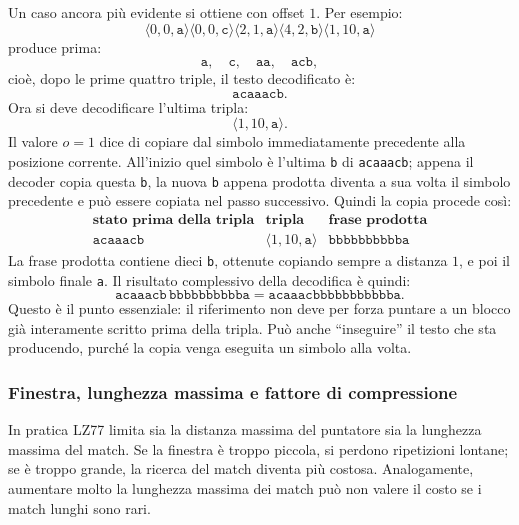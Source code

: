 \documentclass{article}
\theoremstyle{definition}
\numberwithin{equation}{section}
\begin{document}
Un caso ancora più evidente si ottiene con offset $1$. Per esempio:
\[
    \langle 0,0,\texttt{a}\rangle
    \langle 0,0,\texttt{c}\rangle
    \langle 2,1,\texttt{a}\rangle
    \langle 4,2,\texttt{b}\rangle
    \langle 1,10,\texttt{a}\rangle
\]
produce prima:
\[
    \texttt{a},\quad \texttt{c},\quad \texttt{aa},\quad \texttt{acb},
\]
cioè, dopo le prime quattro triple, il testo decodificato è:
\[
    \texttt{acaaacb}.
\]
Ora si deve decodificare l'ultima tripla:
\[
    \langle 1,10,\texttt{a}\rangle.
\]
Il valore $o=1$ dice di copiare dal simbolo immediatamente precedente alla
posizione corrente. All'inizio quel simbolo è l'ultima \texttt{b} di
\texttt{acaaacb}; appena il decoder copia questa \texttt{b}, la nuova
\texttt{b} appena prodotta diventa a sua volta il simbolo precedente e può
essere copiata nel passo successivo. Quindi la copia procede così:
\[
    \begin{array}{c|c|c}
        \textbf{stato prima della tripla} & \textbf{tripla}                & \textbf{frase prodotta} \\ \hline
        \texttt{acaaacb}                  & \langle 1,10,\texttt{a}\rangle & \texttt{bbbbbbbbbba}
    \end{array}
\]
La frase prodotta contiene dieci \texttt{b}, ottenute copiando sempre a
distanza $1$, e poi il simbolo finale \texttt{a}. Il risultato complessivo
della decodifica è quindi:
\[
    \texttt{acaaacb}\,\texttt{bbbbbbbbbba}
    =
    \texttt{acaaacbbbbbbbbbbba}.
\]
Questo è il punto essenziale: il riferimento non deve per forza puntare a
un blocco già interamente scritto prima della tripla. Può anche
``inseguire'' il testo che sta producendo, purché la copia venga eseguita
un simbolo alla volta.

\subsubsection{Finestra, lunghezza massima e fattore di compressione}
In pratica LZ77 limita sia la distanza massima del puntatore sia la lunghezza massima del match. Se la finestra è troppo piccola, si perdono ripetizioni lontane; se è troppo grande, la ricerca del match diventa più costosa. Analogamente, aumentare molto la lunghezza massima dei match può non valere il costo se i match lunghi sono rari.
\end{document}
